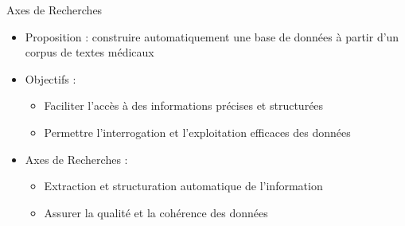 \documentclass[english,french,table,aspectratio=43]{beamer}
\renewcommand{\_}{\ifincsname_\else\legacyunderscore\fi}
\begin{document}
\begin{frame}{Axes de Recherches}
  \begin{itemize}
      \item Proposition : construire automatiquement une base de données à partir d'un corpus de textes médicaux
      \vfill\pause
      \item Objectifs :
      \begin{itemize}
          \item Faciliter l'accès à des informations précises et structurées
          \item Permettre l'interrogation et l'exploitation efficaces des données
      \end{itemize}
      \vfill\pause
      \item Axes de Recherches :
      \begin{itemize}
          \item Extraction et structuration automatique de l'information
          \item Assurer la qualité et la cohérence des données
      \end{itemize}
  \end{itemize}
\end{frame}



\end{document}
